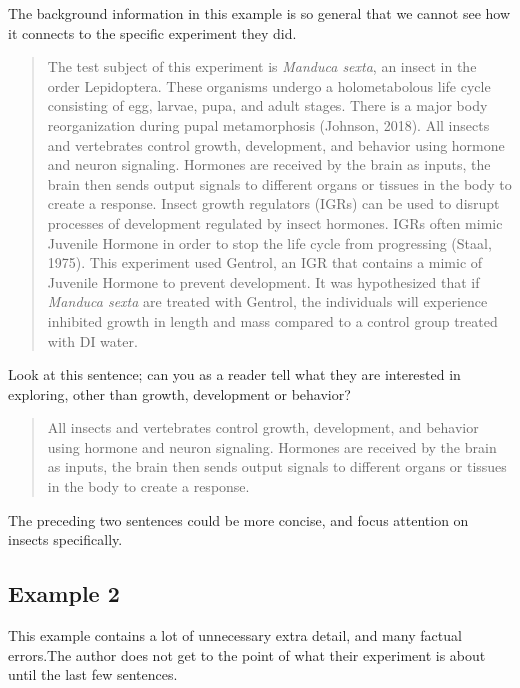 \documentclass[
]{book}
\begin{document}
The background information in this example is so general that we cannot see how it connects to the specific experiment they did.

\begin{quote}
The test subject of this experiment is \emph{Manduca sexta}, an insect in the order Lepidoptera. These organisms undergo a holometabolous life cycle consisting of egg, larvae, pupa, and adult stages. There is a major body reorganization during pupal metamorphosis (Johnson, 2018). All insects and vertebrates control growth, development, and behavior using hormone and neuron signaling. Hormones are received by the brain as inputs, the brain then sends output signals to different organs or tissues in the body to create a response. Insect growth regulators (IGRs) can be used to disrupt processes of development regulated by insect hormones. IGRs often mimic Juvenile Hormone in order to stop the life cycle from progressing (Staal, 1975). This experiment used Gentrol, an IGR that contains a mimic of Juvenile Hormone to prevent development. It was hypothesized that if \emph{Manduca sexta} are treated with Gentrol, the individuals will experience inhibited growth in length and mass compared to a control group treated with DI water.
\end{quote}

Look at this sentence; can you as a reader tell what they are interested in exploring, other than growth, development or behavior?

\begin{quote}
All insects and vertebrates control growth, development, and behavior using hormone and neuron signaling. Hormones are received by the brain as inputs, the brain then sends output signals to different organs or tissues in the body to create a response.
\end{quote}

The preceding two sentences could be more concise, and focus attention on insects specifically.

\hypertarget{example-2-2}{%
\subsection{Example 2}\label{example-2-2}}

This example contains a lot of unnecessary extra detail, and many factual errors.The author does not get to the point of what their experiment is about until the last few sentences.
\end{document}
